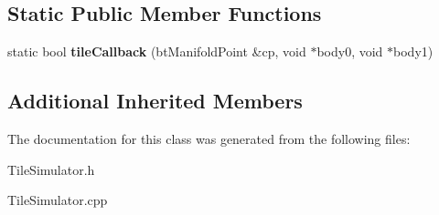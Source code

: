 \subsection*{Static Public Member Functions}
\begin{DoxyCompactItemize}
\item 
\hypertarget{classTileSimulator_abe7afed920e22486c1a19e162a601bca}{static bool {\bfseries tile\-Callback} (bt\-Manifold\-Point \&cp, void $\ast$body0, void $\ast$body1)}\label{classTileSimulator_abe7afed920e22486c1a19e162a601bca}

\end{DoxyCompactItemize}
\subsection*{Additional Inherited Members}


The documentation for this class was generated from the following files\-:\begin{DoxyCompactItemize}
\item 
Tile\-Simulator.\-h\item 
Tile\-Simulator.\-cpp\end{DoxyCompactItemize}

